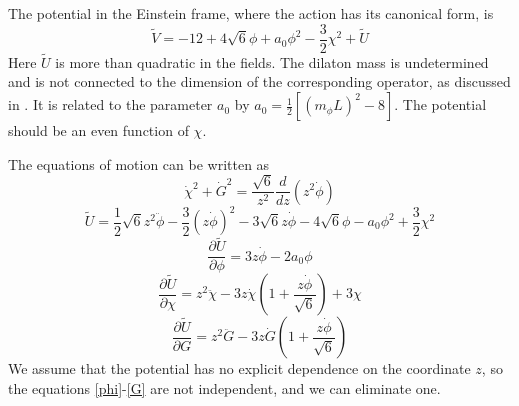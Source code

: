 \documentclass[12pt]{article}
\newcommand{\be}{\begin{equation}}
\newcommand{\ee}{\end{equation}}
\def\thalf{{\textstyle{\frac{1}{2}}}}
\def\tthalf{{\textstyle{\frac{3}{2}}}}
\def\Dz{\frac{d}{dz}}
\def\phidot{\dot{\phi}}
\def\phiddot{\ddot{\phi}}
\def\chidot{\dot{\chi}}
\def\chiddot{\ddot{\chi}}
\def\Gdot{\dot{G}}
\def\Gddot{\ddot{G}}
\def\rt6{\sqrt{6}}
\def\mL2{(m_{\phi}L)^2}
\begin{document}
The potential in the Einstein frame, where the action has its canonical form, is
\be
\tilde{V} = -12 + 4\sqrt{6}\phi + a_0\phi^2 -\tthalf\chi^2 + \tilde{U}
\label{V}
\ee
Here $\tilde{U}$ is more than quadratic in the fields.  
The dilaton mass is undetermined and is not connected to the dimension of the corresponding operator, as discussed in \cite{Springer2010}.  
It is related to the parameter $a_0$ by $a_0 = \thalf \left[ \mL2-8 \right]$. 
The potential should be an even function of $\chi$. 

The equations of motion can be written as
\be
\chidot^2 + \Gdot^2 = \frac{\rt6}{z^2} \Dz(z^2\phidot)
\label{C}
\ee
\be
\tilde{U}=\thalf \rt6 z^2 \phiddot - \tthalf (z\phidot)^2 - 3 \rt6 z\phidot 
-4\sqrt{6}\phi - a_0\phi^2 +\tthalf\chi^2
\label{U}
\ee
\be
 \frac{\partial \tilde{U}}{\partial \phi}=3z\phidot - 2a_0\phi
\label{phi}
\ee
\be
 \frac{\partial \tilde{U}}{\partial \chi}
=z^2\chiddot -3z\chidot \left(1+\frac{z\phidot}{\rt6} \right) + 3\chi
\label{chi}
\ee
\be
 \frac{\partial \tilde{U}}{\partial G}=
z^2\Gddot -3z\Gdot \left(1+\frac{z\phidot}{\rt6} \right)
\label{G}
\ee
We assume that the potential has no explicit dependence on the coordinate $z$,  so the equations \ref{phi}-\ref{G} are not independent, and we can eliminate one. 
\end{document}
